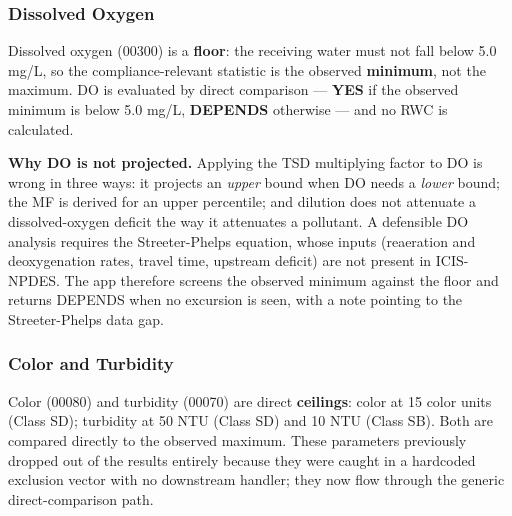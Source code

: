 \documentclass[
  11pt,
  letterpaper,
  DIV=11,
  numbers=noendperiod]{scrartcl}
\begin{document}
\subsubsection{Dissolved Oxygen}\label{sec-do}

Dissolved oxygen (00300) is a \textbf{floor}: the receiving water must
not fall below 5.0 mg/L, so the compliance-relevant statistic is the
observed \textbf{minimum}, not the maximum. DO is evaluated by direct
comparison --- \textbf{YES} if the observed minimum is below 5.0 mg/L,
\textbf{DEPENDS} otherwise --- and no RWC is calculated.

\begin{tcolorbox}[enhanced jigsaw, arc=.35mm, bottomrule=.15mm, bottomtitle=1mm, breakable, colback=white, colbacktitle=quarto-callout-important-color!10!white, colframe=quarto-callout-important-color-frame, coltitle=black, left=2mm, leftrule=.75mm, opacityback=0, opacitybacktitle=0.6, rightrule=.15mm, title=\textcolor{quarto-callout-important-color}{\faExclamation}\hspace{0.5em}{Important}, titlerule=0mm, toprule=.15mm, toptitle=1mm]

\textbf{Why DO is not projected.} Applying the TSD multiplying factor to
DO is wrong in three ways: it projects an \emph{upper} bound when DO
needs a \emph{lower} bound; the MF is derived for an upper percentile;
and dilution does not attenuate a dissolved-oxygen deficit the way it
attenuates a pollutant. A defensible DO analysis requires the
Streeter-Phelps equation, whose inputs (reaeration and deoxygenation
rates, travel time, upstream deficit) are not present in ICIS-NPDES. The
app therefore screens the observed minimum against the floor and returns
DEPENDS when no excursion is seen, with a note pointing to the
Streeter-Phelps data gap.

\end{tcolorbox}

\subsubsection{Color and Turbidity}\label{sec-color-turbidity}

Color (00080) and turbidity (00070) are direct \textbf{ceilings}: color
at 15 color units (Class SD); turbidity at 50 NTU (Class SD) and 10 NTU
(Class SB). Both are compared directly to the observed maximum. These
parameters previously dropped out of the results entirely because they
were caught in a hardcoded exclusion vector with no downstream handler;
they now flow through the generic direct-comparison path.
\end{document}
